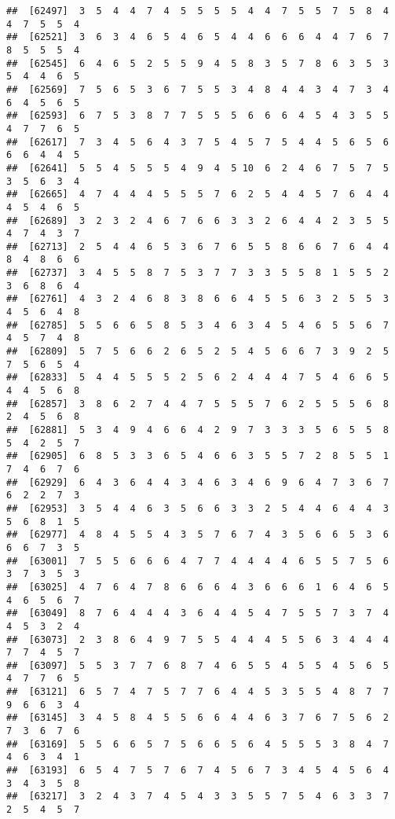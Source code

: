 \documentclass[
]{book}
\begin{document}
\begin{verbatim}
##  [62497]  3  5  4  4  7  4  5  5  5  5  4  4  7  5  5  7  5  8  4  4  7  5  5  4
##  [62521]  3  6  3  4  6  5  4  6  5  4  4  6  6  6  4  4  7  6  7  8  5  5  5  4
##  [62545]  6  4  6  5  2  5  5  9  4  5  8  3  5  7  8  6  3  5  3  5  4  4  6  5
##  [62569]  7  5  6  5  3  6  7  5  5  3  4  8  4  4  3  4  7  3  4  6  4  5  6  5
##  [62593]  6  7  5  3  8  7  7  5  5  5  6  6  6  4  5  4  3  5  5  4  7  7  6  5
##  [62617]  7  3  4  5  6  4  3  7  5  4  5  7  5  4  4  5  6  5  6  6  6  4  4  5
##  [62641]  5  5  4  5  5  5  4  9  4  5 10  6  2  4  6  7  5  7  5  3  5  6  3  4
##  [62665]  4  7  4  4  4  5  5  5  7  6  2  5  4  4  5  7  6  4  4  4  5  4  6  5
##  [62689]  3  2  3  2  4  6  7  6  6  3  3  2  6  4  4  2  3  5  5  4  7  4  3  7
##  [62713]  2  5  4  4  6  5  3  6  7  6  5  5  8  6  6  7  6  4  4  8  4  8  6  6
##  [62737]  3  4  5  5  8  7  5  3  7  7  3  3  5  5  8  1  5  5  2  3  6  8  6  4
##  [62761]  4  3  2  4  6  8  3  8  6  6  4  5  5  6  3  2  5  5  3  4  5  6  4  8
##  [62785]  5  5  6  6  5  8  5  3  4  6  3  4  5  4  6  5  5  6  7  4  5  7  4  8
##  [62809]  5  7  5  6  6  2  6  5  2  5  4  5  6  6  7  3  9  2  5  7  5  6  5  4
##  [62833]  5  4  4  5  5  5  2  5  6  2  4  4  4  7  5  4  6  6  5  4  4  5  6  8
##  [62857]  3  8  6  2  7  4  4  7  5  5  5  7  6  2  5  5  5  6  8  2  4  5  6  8
##  [62881]  5  3  4  9  4  6  6  4  2  9  7  3  3  3  5  6  5  5  8  5  4  2  5  7
##  [62905]  6  8  5  3  3  6  5  4  6  6  3  5  5  7  2  8  5  5  1  7  4  6  7  6
##  [62929]  6  4  3  6  4  4  3  4  6  3  4  6  9  6  4  7  3  6  7  6  2  2  7  3
##  [62953]  3  5  4  4  6  3  5  6  6  3  3  2  5  4  4  6  4  4  3  5  6  8  1  5
##  [62977]  4  8  4  5  5  4  3  5  7  6  7  4  3  5  6  6  5  3  6  6  6  7  3  5
##  [63001]  7  5  5  6  6  6  4  7  7  4  4  4  4  6  5  5  7  5  6  3  7  3  5  3
##  [63025]  4  7  6  4  7  8  6  6  6  4  3  6  6  6  1  6  4  6  5  4  6  5  6  7
##  [63049]  8  7  6  4  4  4  3  6  4  4  5  4  7  5  5  7  3  7  4  4  5  3  2  4
##  [63073]  2  3  8  6  4  9  7  5  5  4  4  4  5  5  6  3  4  4  4  7  7  4  5  7
##  [63097]  5  5  3  7  7  6  8  7  4  6  5  5  4  5  5  4  5  6  5  4  7  7  6  5
##  [63121]  6  5  7  4  7  5  7  7  6  4  4  5  3  5  5  4  8  7  7  9  6  6  3  4
##  [63145]  3  4  5  8  4  5  5  6  6  4  4  6  3  7  6  7  5  6  2  7  3  6  7  6
##  [63169]  5  5  6  6  5  7  5  6  6  5  6  4  5  5  5  3  8  4  7  4  6  3  4  1
##  [63193]  6  5  4  7  5  7  6  7  4  5  6  7  3  4  5  4  5  6  4  3  4  3  5  8
##  [63217]  3  2  4  3  7  4  5  4  3  3  5  5  7  5  4  6  3  3  7  2  5  4  5  7

\end{verbatim}
\end{document}
